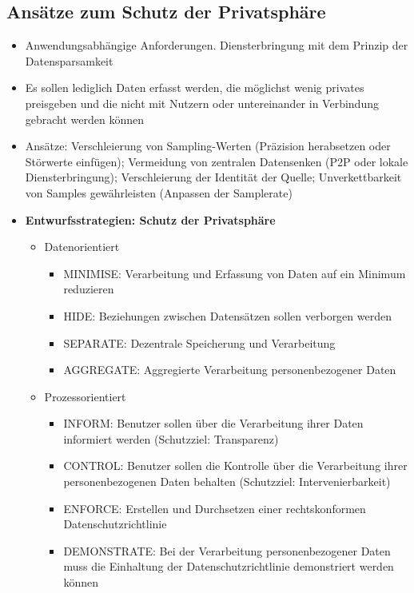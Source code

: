 \subsection{Ansätze zum Schutz der Privatsphäre}
\begin{itemize}
	\item Anwendungsabhängige Anforderungen. Diensterbringung mit dem Prinzip der Datensparsamkeit
	\item Es sollen lediglich Daten erfasst werden, die möglichst wenig privates preisgeben und die nicht mit Nutzern oder untereinander in Verbindung gebracht werden können
	\item Ansätze: Verschleierung von Sampling-Werten (Präzision herabsetzen oder Störwerte einfügen); Vermeidung von zentralen Datensenken (P2P oder lokale Diensterbringung); Verschleierung der Identität der Quelle; Unverkettbarkeit von Samples gewährleisten (Anpassen der Samplerate)
	\item \textbf{Entwurfsstrategien: Schutz der Privatsphäre}
	\begin{itemize}
		\item Datenorientiert
		\begin{itemize}
			\item MINIMISE: Verarbeitung und Erfassung von Daten auf ein Minimum reduzieren
			\item HIDE: Beziehungen zwischen Datensätzen sollen verborgen werden
			\item SEPARATE: Dezentrale Speicherung und Verarbeitung
			\item AGGREGATE: Aggregierte Verarbeitung personenbezogener Daten
		\end{itemize}
		\item Prozessorientiert
		\begin{itemize}
			\item INFORM: Benutzer sollen über die Verarbeitung ihrer Daten informiert werden (Schutzziel: Transparenz)
			\item CONTROL: Benutzer sollen die Kontrolle über die Verarbeitung ihrer personenbezogenen Daten behalten (Schutzziel: Intervenierbarkeit)
			\item ENFORCE: Erstellen und Durchsetzen einer rechtskonformen Datenschutzrichtlinie
			\item DEMONSTRATE: Bei der Verarbeitung personenbezogener Daten muss die Einhaltung der Datenschutzrichtlinie demonstriert werden können
		\end{itemize}
	\end{itemize}
\end{itemize}


